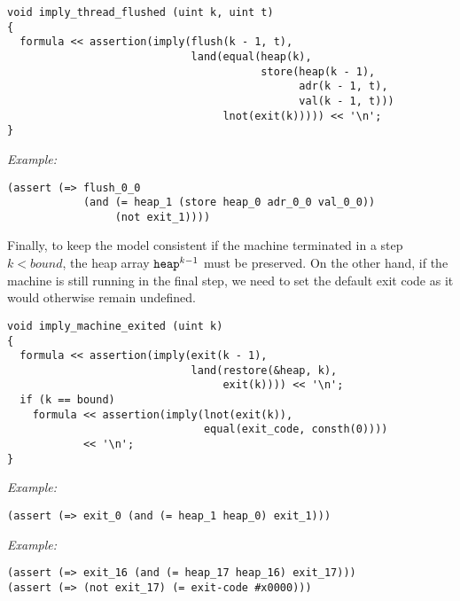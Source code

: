 \begin{lstlisting}[style=c++]
void imply_thread_flushed (uint k, uint t)
{
  formula << assertion(imply(flush(k - 1, t),
                             land(equal(heap(k),
                                        store(heap(k - 1),
                                              adr(k - 1, t),
                                              val(k - 1, t)))
                                  lnot(exit(k))))) << '\n';
}
\end{lstlisting}

\noindent
\emph{Example:} 

\begin{lstlisting}[style=smtlib]
(assert (=> flush_0_0
            (and (= heap_1 (store heap_0 adr_0_0 val_0_0))
                 (not exit_1))))
\end{lstlisting}


\noindent
Finally, to keep the model consistent if the machine terminated in a step $k < bound$, the heap array $\texttt{heap}^{k - 1}$ must be preserved.
On the other hand, if the machine is still running in the final step,
we need to set the default exit code as it would otherwise remain undefined.

\begin{lstlisting}[style=c++]
void imply_machine_exited (uint k)
{
  formula << assertion(imply(exit(k - 1),
                             land(restore(&heap, k),
                                  exit(k)))) << '\n';
  if (k == bound)
    formula << assertion(imply(lnot(exit(k)),
                               equal(exit_code, consth(0))))
            << '\n';
}
\end{lstlisting}

\noindent
\emph{Example:} 

\begin{lstlisting}[style=smtlib]
(assert (=> exit_0 (and (= heap_1 heap_0) exit_1)))
\end{lstlisting}

\noindent
\emph{Example:} 

\begin{lstlisting}[style=smtlib]
(assert (=> exit_16 (and (= heap_17 heap_16) exit_17)))
(assert (=> (not exit_17) (= exit-code #x0000)))
\end{lstlisting}

